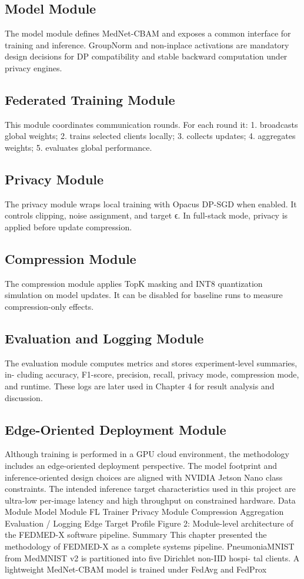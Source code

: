 \subsection{Model Module}
The model module defines MedNet-CBAM and exposes a common interface for training and inference. GroupNorm and non-inplace activations are mandatory design decisions for DP compatibility and stable backward computation under privacy engines.
\subsection{Federated Training Module}
This module coordinates communication rounds. For each round it:
1. broadcasts global weights; 2. trains selected clients locally; 3. collects updates; 4. aggregates weights; 5. evaluates global performance.
\subsection{Privacy Module}
The privacy module wraps local training with Opacus DP-SGD when enabled.
It controls clipping, noise assignment, and target ϵ. In full-stack mode, privacy is applied before update compression.
\subsection{Compression Module}
The compression module applies TopK masking and INT8 quantization simulation on model updates. It can be disabled for baseline runs to measure compression-only effects.

\subsection{Evaluation and Logging Module}
The evaluation module computes metrics and stores experiment-level summaries, in- cluding accuracy, F1-score, precision, recall, privacy mode, compression mode, and runtime. These logs are later used in Chapter 4 for result analysis and discussion.
\subsection{Edge-Oriented Deployment Module}
Although training is performed in a GPU cloud environment, the methodology includes an edge-oriented deployment perspective. The model footprint and inference-oriented design choices are aligned with NVIDIA Jetson Nano class constraints. The intended inference target characteristics used in this project are ultra-low per-image latency and high throughput on constrained hardware.
Data Module
Model Module
FL Trainer
Privacy Module
Compression
Aggregation
Evaluation / Logging
Edge Target Profile
Figure 2: Module-level architecture of the FEDMED-X software pipeline.
Summary
This chapter presented the methodology of FEDMED-X as a complete systems pipeline.
PneumoniaMNIST from MedMNIST v2 is partitioned into five Dirichlet non-IID hospi- tal clients. A lightweight MedNet-CBAM model is trained under FedAvg and FedProx

